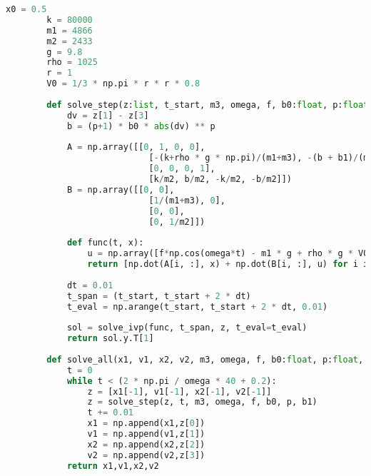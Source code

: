 \documentclass[withoutpreface,bwprint]{cumcmthesis} %
\begin{document}
\begin{appendices}
\begin{lstlisting}[language=python]
        x0 = 0.5
        k = 80000
        m1 = 4866
        m2 = 2433
        g = 9.8
        rho = 1025
        r = 1
        V0 = 1/3 * np.pi * r * r * 0.8 
        
        def solve_step(z:list, t_start, m3, omega, f, b0:float, p:float, b1:float)->list:
            dv = z[1] - z[3]
            b = (p+1) * b0 * abs(dv) ** p
        
            A = np.array([[0, 1, 0, 0], 
                            [-(k+rho * g * np.pi)/(m1+m3), -(b + b1)/(m1+m3), k/(m1+m3), b/(m1+m3)], 
                            [0, 0, 0, 1], 
                            [k/m2, b/m2, -k/m2, -b/m2]])
            B = np.array([[0, 0], 
                            [1/(m1+m3), 0], 
                            [0, 0], 
                            [0, 1/m2]])
        
            def func(t, x):
                u = np.array([f*np.cos(omega*t) - m1 * g + rho * g * V0 - (p * b0 * abs(dv) ** (p+1)) - k * x0, - m2 * g + (p * b0 * abs(dv) ** (p+1)) + k * x0])
                return [np.dot(A[i, :], x) + np.dot(B[i, :], u) for i in range(4)]
        
            dt = 0.01
            t_span = (t_start, t_start + 2 * dt)
            t_eval = np.arange(t_start, t_start + 2 * dt, 0.01)
        
            sol = solve_ivp(func, t_span, z, t_eval=t_eval)
            return sol.y.T[1]
        
        def solve_all(x1, v1, x2, v2, m3, omega, f, b0:float, p:float, b1:float):
            t = 0
            while t < (2 * np.pi / omega * 40 + 0.2):
                z = [x1[-1], v1[-1], x2[-1], v2[-1]]
                z = solve_step(z, t, m3, omega, f, b0, p, b1)
                t += 0.01
                x1 = np.append(x1,z[0])
                v1 = np.append(v1,z[1])
                x2 = np.append(x2,z[2])
                v2 = np.append(v2,z[3])
            return x1,v1,x2,v2
        


\end{lstlisting}
\end{appendices}
\end{document}
